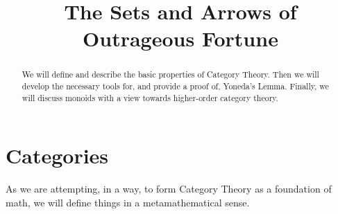 \documentclass[12pt,a4paper]{article}
\title{The Sets and Arrows of Outrageous Fortune}
\date{}
\begin{document}
	

	
\maketitle

\begin{abstract}
We will define and describe the basic properties of Category Theory.
Then we will develop the necessary tools for, and provide a proof of, Yoneda's Lemma.
Finally, we will discuss monoids with a view towards higher-order category theory.
\end{abstract}
\section{Categories}

As we are attempting, in a way, to form Category Theory as a foundation of math, we will define things in a metamathematical sense.
\end{document}
